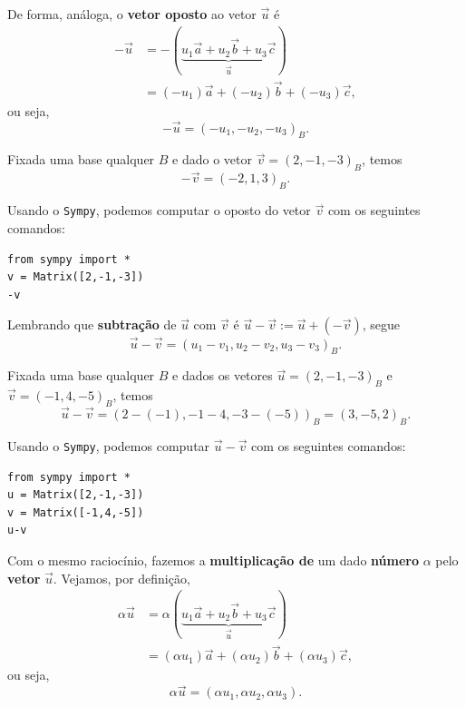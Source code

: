 De forma, análoga, o {\bf vetor oposto} ao vetor $\vec{u}$ é
\begin{align}
  -\vec{u} &= -(\underbrace{u_1\vec{a} + u_2\vec{b} + u_3\vec{c}}_{\vec{u}})\\
           &= (-u_1)\vec{a} + (-u_2)\vec{b} + (-u_3)\vec{c},
\end{align}
ou seja,
\begin{equation}
  -\vec{u} = (-u_1, -u_2, -u_3)_B.
\end{equation}

\begin{ex}
  Fixada uma base qualquer $B$ e dado o vetor $\vec{v} = (2, -1, -3)_B$, temos
  \begin{equation}
    -\vec{v} = \left(-2, 1, 3\right)_B.
  \end{equation}

  \ifispython
  Usando o \verb+Sympy+, podemos computar o oposto do vetor $\vec{v}$ com os seguintes comandos:
\begin{verbatim}
from sympy import *
v = Matrix([2,-1,-3])
-v
\end{verbatim}
  \fi
\end{ex}


Lembrando que {\bf subtração} de $\vec{u}$ com $\vec{v}$ é $\vec{u}-\vec{v} := \vec{u} + (-\vec{v})$, segue
\begin{equation}
  \vec{u}-\vec{v} = (u_1-v_1, u_2-v_2, u_3-v_3)_B.
\end{equation}

\begin{ex}
  Fixada uma base qualquer $B$ e dados os vetores $\vec{u} = (2, -1, -3)_B$ e $\vec{v} = (-1, 4, -5)_B$, temos
  \begin{equation}
    \vec{u}-\vec{v} = \left(2-(-1), -1-4, -3-(-5)\right)_B = (3,-5,2)_B.
  \end{equation}

  \ifispython
  Usando o \verb+Sympy+, podemos computar $\vec{u}-\vec{v}$ com os seguintes comandos:
\begin{verbatim}
from sympy import *
u = Matrix([2,-1,-3])
v = Matrix([-1,4,-5])
u-v
\end{verbatim}
  \fi
\end{ex}


Com o mesmo raciocínio, fazemos a {\bf multiplicação de} um dado {\bf número} $\alpha$ pelo {\bf vetor} $\vec{u}$. Vejamos, por definição,
\begin{align}
  \alpha\vec{u} &= \alpha(\underbrace{u_1\vec{a} + u_2\vec{b} + u_3\vec{c}}_{\vec{u}})\\
                &= (\alpha u_1)\vec{a} + (\alpha u_2)\vec{b} + (\alpha u_3)\vec{c},
\end{align}
ou seja,
\begin{equation}
  \alpha\vec{u} = (\alpha u_1,\alpha u_2, \alpha u_3).
\end{equation}

